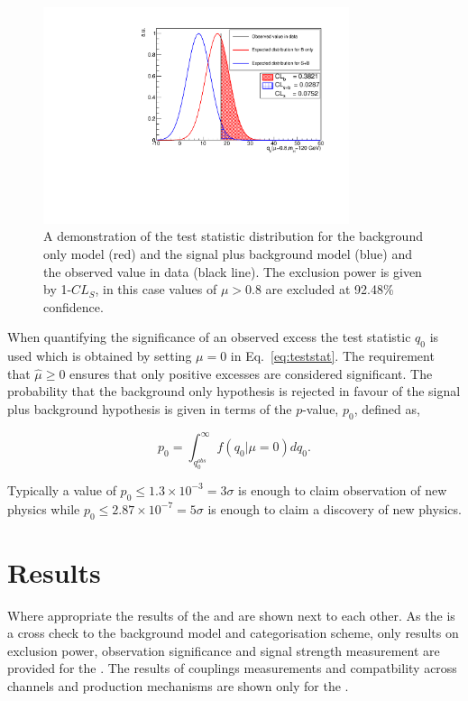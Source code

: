 \begin{figure}
  \begin{center}
    \includegraphics[width=0.8\textwidth]{ch5_anal_and_results/plots/testStatDrawing.pdf}
    \caption{A demonstration of the test statistic distribution for the background only model (red) and the signal plus background model (blue) and the observed value in data (black line). The exclusion power is given by 1-$CL_{S}$, in this case values of $\mu>0.8$ are excluded at 92.48\% confidence.}
    \label{fig:cls}
  \end{center}
\end{figure}

When quantifying the significance of an observed excess the test statistic $q_{0}$ is used which is obtained by setting $\mu=0$ in Eq.~\ref{eq:teststat}. The requirement that $\hat{\mu}\geq0$ ensures that only positive excesses are considered significant. The probability that the background only hypothesis is rejected in favour of the signal plus background hypothesis is given in terms of the $p$-value, $p_{0}$, defined as,

\begin{equation}
  p_{0} = \int_{q_{0}^{obs}}^{\infty}f(q_{0}|\mu=0)dq_{0}.
  \label{eq:pvalue}
\end{equation}

Typically a value of $p_{0}\leq1.3\times10^{-3}=3\sigma$ is enough to claim observation of new physics while $p_{0}\leq2.87\times10^{-7}=5\sigma$ is enough to claim a discovery of new physics.


\section{Results}

Where appropriate the results of the \MFM and \SMVA are shown next to each other. As the \SMVA is a cross check to the background model and categorisation scheme, only results on exclusion power, observation significance and signal strength measurement are provided for the \SMVA. The results of couplings measurements and compatbility across channels and production mechanisms are shown only for the \MFM.

